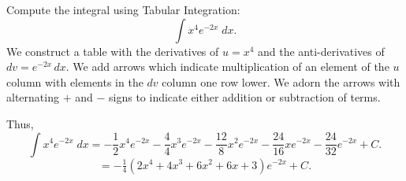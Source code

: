 \documentclass{ximera}
\begin{document}
\begin{example}[example 5]
Compute the integral using Tabular Integration:
  \[
  \int x^4 e^{-2x} \;dx.
  \]
We construct a table with the derivatives of $u = x^4$ and the anti-derivatives of $dv = e^{-2x} \, dx$.
We add arrows which indicate multiplication of an element of the $u$ column with elements in the $dv$ column one row lower.
We adorn the arrows with alternating $+$ and $-$ signs to indicate either addition or subtraction of terms.
\begin{image}[5cm]
\end{image}

Thus,
\[
  \int x^4 e^{-2x} \;dx = -\frac12 x^4 e^{-2x} - \frac44x^3 e^{-2x} - \frac{12}{8} x^2 e^{-2x} - \frac{24}{16}x e^{-2x} - \frac{24}{32} e^{-2x} + C.
  \]
\[
= -\tfrac14\left(2 x^4 + 4x^3  + 6 x^2  + 6x  + 3\right) e^{-2x} + C.
\]
\end{example}
\end{document}
